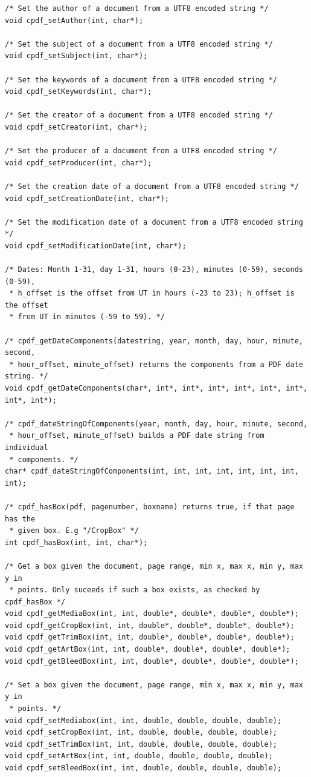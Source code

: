 \documentclass[a4paper]{memoir}
\begin{document}
\begin{small}
\begin{lstlisting}
/* Set the author of a document from a UTF8 encoded string */
void cpdf_setAuthor(int, char*);

/* Set the subject of a document from a UTF8 encoded string */
void cpdf_setSubject(int, char*);

/* Set the keywords of a document from a UTF8 encoded string */
void cpdf_setKeywords(int, char*);

/* Set the creator of a document from a UTF8 encoded string */
void cpdf_setCreator(int, char*);

/* Set the producer of a document from a UTF8 encoded string */
void cpdf_setProducer(int, char*);

/* Set the creation date of a document from a UTF8 encoded string */
void cpdf_setCreationDate(int, char*);

/* Set the modification date of a document from a UTF8 encoded string */
void cpdf_setModificationDate(int, char*);

/* Dates: Month 1-31, day 1-31, hours (0-23), minutes (0-59), seconds (0-59),
 * h_offset is the offset from UT in hours (-23 to 23); h_offset is the offset
 * from UT in minutes (-59 to 59). */

/* cpdf_getDateComponents(datestring, year, month, day, hour, minute, second,
 * hour_offset, minute_offset) returns the components from a PDF date string. */
void cpdf_getDateComponents(char*, int*, int*, int*, int*, int*, int*, int*, int*);

/* cpdf_dateStringOfComponents(year, month, day, hour, minute, second,
 * hour_offset, minute_offset) builds a PDF date string from individual
 * components. */
char* cpdf_dateStringOfComponents(int, int, int, int, int, int, int, int);

/* cpdf_hasBox(pdf, pagenumber, boxname) returns true, if that page has the
 * given box. E.g "/CropBox" */
int cpdf_hasBox(int, int, char*);

/* Get a box given the document, page range, min x, max x, min y, max y in
 * points. Only suceeds if such a box exists, as checked by cpdf_hasBox */
void cpdf_getMediaBox(int, int, double*, double*, double*, double*);
void cpdf_getCropBox(int, int, double*, double*, double*, double*);
void cpdf_getTrimBox(int, int, double*, double*, double*, double*);
void cpdf_getArtBox(int, int, double*, double*, double*, double*);
void cpdf_getBleedBox(int, int, double*, double*, double*, double*);

/* Set a box given the document, page range, min x, max x, min y, max y in
 * points. */
void cpdf_setMediabox(int, int, double, double, double, double);
void cpdf_setCropBox(int, int, double, double, double, double);
void cpdf_setTrimBox(int, int, double, double, double, double);
void cpdf_setArtBox(int, int, double, double, double, double);
void cpdf_setBleedBox(int, int, double, double, double, double);


\end{lstlisting}
\end{small}
\end{document}
